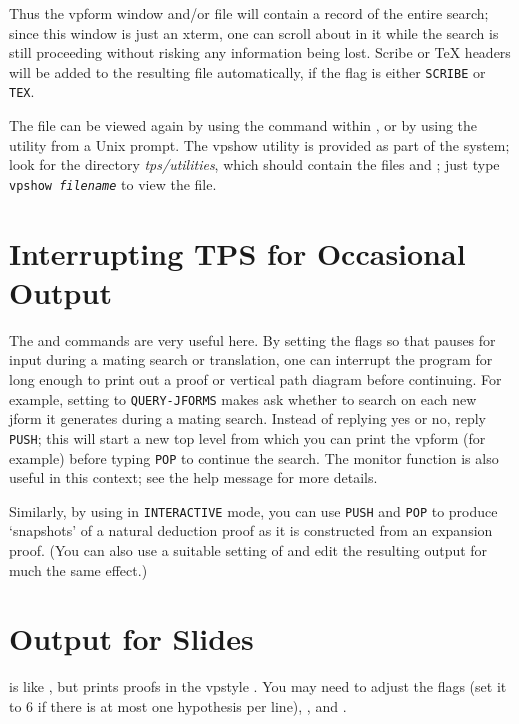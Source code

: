 Thus the vpform window and/or file will contain a record of the entire search;
since this window is just an xterm, one can scroll about in it while the search is
still proceeding without risking any information being lost.
Scribe or TeX headers will be added to the resulting file automatically, if the
 flag is either {\tt SCRIBE} or {\tt TEX}.

The file can be viewed again by using the  command
within {\TPS}, or by using the  utility from a Unix prompt.
The vpshow utility is provided as part of the {\TPS} system; look for the directory
{\it tps/utilities}, which should contain the files  and
; just type {\tt vpshow {\it filename}} to view the file.

\section{Interrupting TPS for Occasional Output}

The  and  commands are very useful here. By setting
the flags so that {\TPS} pauses for input during a mating search or translation, one can
interrupt the program for long enough to print out a proof or vertical path diagram
before continuing. For example, setting  to {\tt QUERY-JFORMS} makes
{\TPS} ask whether to search on each new jform it generates during a mating search. Instead
of replying yes or no, reply {\tt PUSH}; this will start a new top level from which you can
print the vpform (for example) before typing {\tt POP} to continue the search.
The monitor function  is also useful in this context; see the help
message for more details.

Similarly, by using  in {\tt INTERACTIVE} mode, you can use
{\tt PUSH} and {\tt POP} to produce `snapshots' of a natural deduction proof as it is
constructed from an expansion proof. (You
can also use a suitable setting of  and edit the resulting
output for much the same effect.)

\section{Output for Slides}

 is like , but prints
proofs in the vpstyle . You may need to adjust the flags
 (set it to 6 if there is at most one
hypothesis per line), ,
 and .

